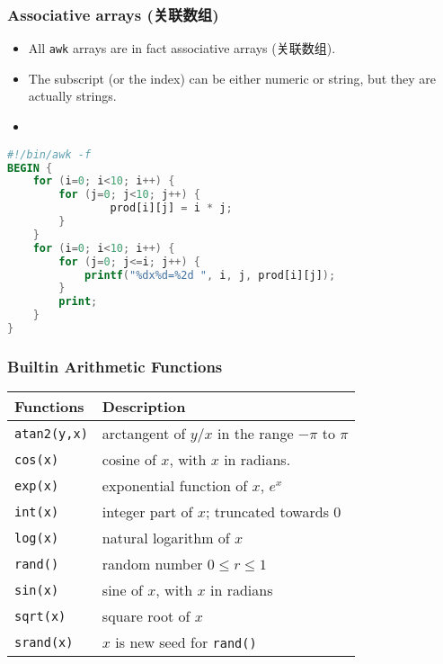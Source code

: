 \documentclass[red]{beamer}
\begin{document}
\begin{CJK*}{UTF8}{gbsn}
\begin{frame}
\frametitle{Associative arrays (关联数组)}
\begin{itemize}
\scriptsize
	\item All \texttt{awk} arrays are in fact associative arrays (关联数组).
	\item The subscript (or the index) can be either numeric or string, but 
		they are actually strings.
	\item 
\end{itemize}
\begin{lstlisting}[language=awk,format=awk]
#!/bin/awk -f
BEGIN {
    for (i=0; i<10; i++) {
        for (j=0; j<10; j++) {
                prod[i][j] = i * j;
        }
    }
    for (i=0; i<10; i++) {
        for (j=0; j<=i; j++) {
            printf("%dx%d=%2d ", i, j, prod[i][j]);
        }
        print;
    }
}
\end{lstlisting}
\end{frame}

\begin{frame}
\frametitle{Builtin Arithmetic Functions}
\begin{table}[ht]
\scriptsize
\renewcommand\arraystretch{1.6}
\begin{tabular}{ll}
\hline
\textbf{Functions} & \textbf{Description}\\
\hline
\texttt{atan2(y,x)} & arctangent of $y/x$ in the range $-\pi$ to $\pi$\\
\texttt{cos(x)} & cosine of $x$, with $x$ in radians.\\
\texttt{exp(x)} & exponential function of $x$, $e^x$\\
\texttt{int(x)} & integer part of $x$; truncated towards 0\\
\texttt{log(x)} & natural logarithm of $x$\\
\texttt{rand()} & random number $0 \le r \le 1$\\
\texttt{sin(x)} & sine of $x$, with $x$ in radians\\
\texttt{sqrt(x)} & square root of $x$\\
\texttt{srand(x)} & $x$ is new seed for \texttt{rand()}\\
\hline
\end{tabular}
\end{table}
\end{frame}



\end{CJK*}
\end{document}

